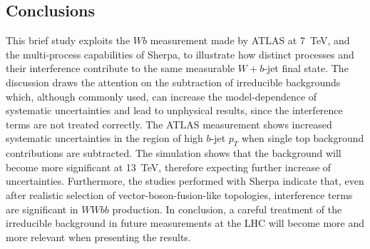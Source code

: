 \documentclass[11pt]{cernrep}
\begin{document}
\subsection{Conclusions}\label{sec:conclusions}

This brief study exploits the $Wb$ measurement made by ATLAS at 7~TeV, 
and the multi-process capabilities of Sherpa, to illustrate 
how distinct processes and their interference contribute to the same measurable $W+b$-jet final state.
The discussion draws the attention on the subtraction of irreducible backgrounds which, although commonly used,
can increase the model-dependence of systematic uncertainties and lead to unphysical results,
since the interference terms are not treated correctly. 
The ATLAS measurement shows increased systematic
uncertainties in the region of high $b$-jet $p_T$ when single top background contributions are subtracted.
The simulation shows that the background will become more significant at 13~TeV, therefore expecting further increase of uncertainties.
Furthermore, the studies performed with Sherpa indicate that, even after realistic selection of vector-boson-fusion-like topologies, 
interference terms are significant in $WWbb$ production. 
In conclusion, a careful treatment of the irreducible background in future measurements at the LHC 
will become more and more relevant when presenting the results.


\end{document}
